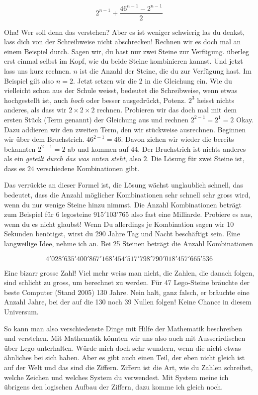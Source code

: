 $$2^{n-1}+\frac{46^{n-1}-2^{n-1}}{2}$$

Oha! Wer soll denn das verstehen? Aber es ist weniger schwierig las du denkst, lass dich von der Schreibweise nicht abschrecken! Rechnen wir es doch mal an einem Beispiel durch. Sagen wir, du hast nur zwei Steine zur Verfügung. überleg erst einmal selbst im Kopf, wie du beide Steine kombinieren kannst.
%
Und jetzt lass uns kurz rechnen. $n$ ist die Anzahl der Steine, die du zur Verfügung hast. Im Beispiel gilt also $n=2$. Jetzt setzen wir die 2 in die Gleichung ein. Wie du vielleicht schon aus der Schule weisst, bedeutet die Schreibweise, wenn etwas hochgestellt ist, auch \textit{hoch} oder besser ausgedrückt, Potenz. $2^3$ heisst nichts anderes, als dass wir $2\times2\times2$ rechnen. Probieren wir das doch mal mit dem ersten Stück (Term genannt) der Gleichung aus und rechnen $2^{2-1}=2^1=2$ Okay. Dazu addieren wir den zweiten Term, den wir stückweise ausrechnen. Beginnen wir über dem Bruchstrich. $46^{2-1}=46$. Davon ziehen wir wieder die bereits bekannten $2^{2-1}=2$ ab und kommen auf 44. Der Bruchstrich ist nichts anderes als ein \textit{geteilt durch das was unten steht}, also $2$. Die Lösung für zwei Steine ist, dass es $24$ verschiedene Kombinationen gibt.

% 
%
Das verrückte an dieser Formel ist, die Lösung wächst unglaublich schnell, das bedeutet, dass die Anzahl möglicher Kombinationen sehr schnell sehr gross wird, wenn du nur wenige Steine hinzu nimmst. Die Anzahl Kombinationen beträgt zum Beispiel für 6 legosteine $915'103’765$ also fast eine Milliarde. Probiere es aus, wenn du es nicht glaubst! Wenn Du allerdings je Kombination sagen wir 10 Sekunden benötigst, wirst du 290 Jahre Tag und Nacht beschäftigt sein. Eine langweilige Idee, nehme ich an. Bei 25 Steinen beträgt die Anzahl Kombinationen

\begin{footnotesize} 
$$4'028'635'400'867'168'454'517'798'790'018'457'665’536$$
\end{footnotesize} 
 
Eine bizarr grosse Zahl! Viel mehr weiss man nicht, die Zahlen, die danach folgen, sind schlicht zu gross, um berechnet zu werden. Für 47 Lego-Steine bräuchte der beste Computer (Stand 2005) 130 Jahre. Nein halt, ganz falsch, er bräuchte eine Anzahl Jahre, bei der auf die 130 noch 39 Nullen folgen! Keine Chance in diesem Universum.

So kann man also verschiedenste Dinge mit Hilfe der Mathematik beschreiben und verstehen. Mit Mathematik könnten wir uns also auch mit Ausserirdischen über Lego unterhalten. Würde mich doch sehr wundern, wenn die nicht etwas ähnliches bei sich haben. Aber es gibt auch einen Teil, der eben nicht gleich ist auf der Welt und das sind die Ziffern. Ziffern ist die Art, wie du Zahlen schreibst, welche Zeichen und welches System du verwendest. Mit System meine ich übrigens den logischen Aufbau der Ziffern, dazu komme ich gleich noch.
 
